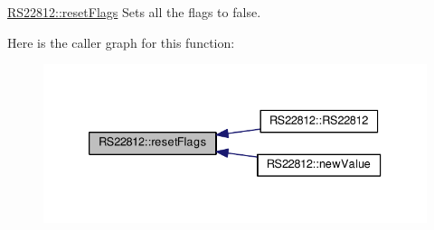 \hyperlink{class_r_s22812_a64f4658259e355d64dcaaa92eac65e93}{R\-S22812\-::reset\-Flags} Sets all the flags to false. 



Here is the caller graph for this function\-:\nopagebreak
\begin{figure}[H]
\begin{center}
\leavevmode
\includegraphics[width=333pt]{class_r_s22812_a64f4658259e355d64dcaaa92eac65e93_icgraph}
\end{center}
\end{figure}




